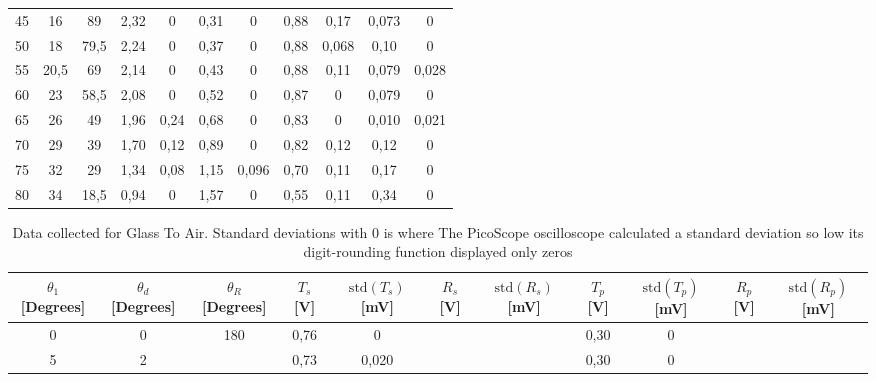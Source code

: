 \begin{landscape}
\begin{table}[!ht]
\begin{tabular}{ccccccccccc}
                45       & 16       & 89       & 2,32  & 0       & 0,31   & 0         & 0,88  & 0,17    & 0,073 & 0         \\
                50       & 18       & 79,5     & 2,24  & 0       & 0,37   & 0         & 0,88  & 0,068   & 0,10  & 0         \\
                55       & 20,5     & 69       & 2,14  & 0       & 0,43   & 0         & 0,88  & 0,11    & 0,079 & 0,028   \\
                60       & 23       & 58,5     & 2,08  & 0       & 0,52   & 0         & 0,87  & 0       & 0,079 & 0         \\
                65       & 26       & 49       & 1,96  & 0,24    & 0,68   & 0         & 0,83  & 0       & 0,010 & 0,021   \\
                70       & 29       & 39       & 1,70  & 0,12    & 0,89   & 0         & 0,82  & 0,12    & 0,12  & 0         \\
                75       & 32       & 29       & 1,34  & 0,08    & 1,15   & 0,096     & 0,70  & 0,11    & 0,17  & 0         \\
                80       & 34       & 18,5     & 0,94  & 0       & 1,57   & 0         & 0,55  & 0,11    & 0,34  & 0 \\       
                                \hline
            \end{tabular}
        \end{table}
        \begin{table}[!ht]
                    \caption{Data collected for Glass To Air.  Standard deviations with $0$ is where The PicoScope oscilloscope calculated a standard deviation so low its digit-rounding function displayed only zeros}
            \centering
            \begin{tabular}{ccccccccccc}
                \hline\hline
                $\theta_1$ [\textup{Degrees}] & $\theta_d$ [\textup{Degrees}] & $\theta_R$ [\textup{Degrees}]& $T_s$ [\textup{V}] & $\mathrm{std}(T_s)$ [\textup{mV}] & $R_s$ [\textup{V}] & $\mathrm{std}(R_s)$ [\textup{mV}] & $T_p$ [\textup{V}] & $\mathrm{std}(T_p)$ [\textup{mV}] & $R_p$ [\textup{V}] & $\mathrm{std}(R_p)$ [\textup{mV}]\\               
                \hline
                0              & 0             & 180      & 0,76   & 0       &         &         & 0,30 & 0         &         &        \\
                5              & 2             &          & 0,73   & 0,020   &         &         & 0,30 & 0         &         &        \\

\end{tabular}
\end{table}
\end{landscape}
